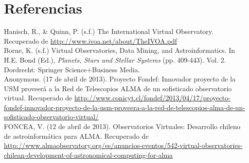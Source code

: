 \documentclass[11pt]{article}
\begin{document}
      \newpage

      \section{Referencias}
          Hanisch, R., \& Quinn, P. (s.f.) The International Virtual
Observatory. Recuperado de \url{http://www.ivoa.net/about/TheIVOA.pdf}\\

          Borne, K. (s.f.) Virtual Observatories, Data Mining, and
Astroinformatics. In H.E. Bond (Ed.), \textit{Planets, Stars and Stellar
Systems} (pp. 409-443). Vol. 2. Dordrecht: Springer Science$ + $Business
Media.\\

          Anonymous. (17 de abril de 2013). Proyecto Fondef: Innovador proyecto
de la USM proveer\'{a} a la Red de Telescopios ALMA de un sofisticado
observatorio virtual. Recuperado de
\url{http://www.conicyt.cl/fondef/2013/04/17/proyecto-fondef-innovador-proyecto-de-la-usm-proveera-a-la-red-de-telescopios-alma-de-un-sofisticado-observatorio-virtual/}\\

          FONCEA, V. (12 de abril de 2013). Observatorios Virtuales: Desarrollo
chileno de astroinform\'{a}tica para ALMA. Recuperado de
\url{http://www.almaobservatory.org/es/anuncios-eventos/542-virtual-observatories-chilean-development-of-astronomical-computing-for-alma}\\
\end{document}
